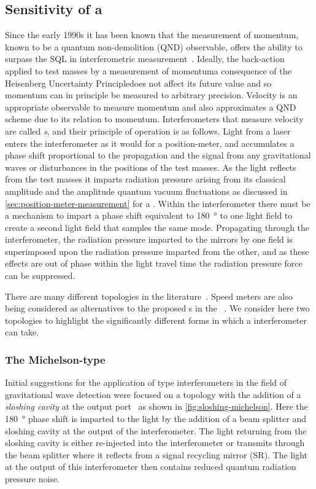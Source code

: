 \subsection{\label{sec:speed-meter-measurement}Sensitivity of a \SM{}}
Since the early 1990s it has been known that the measurement of momentum, known to be a quantum non-demolition (\gls{QND}) observable, offers the ability to surpass the \gls{SQL} in interferometric measurement~\cite{Braginsky1990}. Ideally, the back-action applied to test masses by a measurement of momentum\textemdash a consequence of the Heisenberg Uncertainty Principle\textemdash does not affect its future value and so momentum can in principle be measured to arbitrary precision. Velocity is an appropriate observable to measure momentum and also approximates a \gls{QND} scheme due to its relation to momentum. Interferometers that measure velocity are called \emph{\SM{}s}, and their principle of operation is as follows. Light from a laser enters the interferometer as it would for a position-meter, and accumulates a phase shift proportional to the propagation and the signal from any gravitational waves or disturbances in the positions of the test masses. As the light reflects from the test masses it imparts radiation pressure arising from its classical amplitude and the amplitude quantum vacuum fluctuations as discussed in \cref{sec:position-meter-measurement} for a \FPMI{}. Within the interferometer there must be a mechanism to impart a phase shift equivalent to \SI{180}{\degree} to one light field to create a second light field that samples the same mode. Propagating through the interferometer, the radiation pressure imparted to the mirrors by one field is superimposed upon the radiation pressure imparted from the other, and as these effects are out of phase within the light travel time the radiation pressure force can be suppressed.

There are many different \SM{} topologies in the literature~\cite{Danilishin2004, Wang2013, Huttner2016, Wade2012}. Speed meters are also being considered as alternatives to the proposed \MI{}s in the \ET{}~\cite{MuellerEbhardt2009a, Voronchev2015}. We consider here two \SM{} topologies to highlight the significantly different forms in which a \SM{} interferometer can take.

\subsubsection{The Michelson-type \SM{}}
Initial suggestions for the application of \SM{} type interferometers in the field of gravitational wave detection were focused on a \FPMI{} topology with the addition of a \emph{sloshing cavity} at the output port~\cite{Braginsky2000, Purdue2002} as shown in \cref{fig:sloshing-michelson}. Here the \SI{180}{\degree} phase shift is imparted to the light by the addition of a beam splitter and sloshing cavity at the output of the interferometer. The light returning from the sloshing cavity is either re-injected into the interferometer or transmits through the beam splitter where it reflects from a signal recycling mirror (SR). The light at the output of this interferometer then contains reduced quantum radiation pressure noise.

